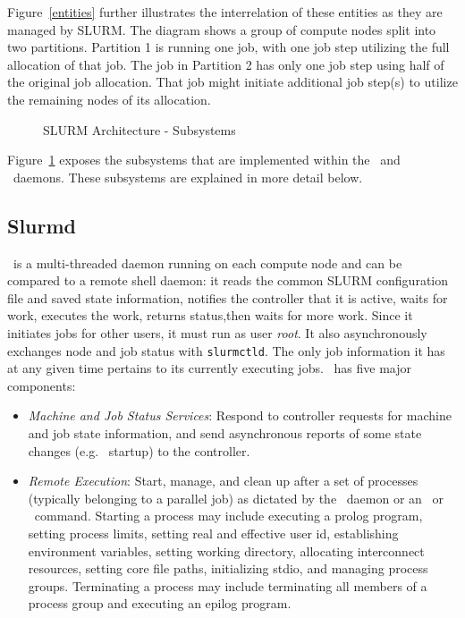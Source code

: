 \documentclass[10pt,onecolumn,times]{../common/llncs}
\begin{document}
{Figure~\ref{entities} further illustrates the interrelation of these
entities as they are managed by SLURM. The diagram shows a group of
compute nodes split into two partitions. Partition 1 is running one job,
with one job step utilizing the full allocation of that job.  The job
in Partition 2 has only one job step using half of the original job
allocation.  That job might initiate additional job step(s) to utilize
the remaining nodes of its allocation.

\begin{figure}[tb]
\centerline{}
\caption{SLURM Architecture - Subsystems}
\label{archdetail}
\end{figure}

Figure~\ref{archdetail} exposes the subsystems that are implemented
within the \slurmd\ and \slurmctld\ daemons.  These subsystems are
explained in more detail below.

\subsection{Slurmd}

\slurmd\ is a multi-threaded daemon running on each compute node and
can be compared to a remote shell daemon: it reads the common SLURM
configuration file and saved state information, 
notifies the controller that it is active, waits
for work, executes the work, returns status,then waits for more work.
Since it initiates jobs for other users, it must run as user {\em root}.
It also asynchronously exchanges node and job status with {\tt slurmctld}.
The only job information it has at any given time pertains to its
currently executing jobs.  \slurmd\ has five major components:

\begin{itemize}
\item {\em Machine and Job Status Services}:  Respond to controller
requests for machine and job state information, and send asynchronous
reports of some state changes (e.g. \slurmd\ startup) to the controller.

\item {\em Remote Execution}: Start, manage, and clean up after a set
of processes (typically belonging to a parallel job) as dictated by
the \slurmctld\ daemon or an \srun\ or \scancel\ command. Starting a
process may include executing a prolog program, setting process limits,
setting real and effective user id, establishing environment variables,
setting working directory, allocating interconnect resources, setting core
file paths, initializing stdio, and managing process groups. Terminating
a process may include terminating all members of a process group and
executing an epilog program.


\end{itemize}}
\end{document}
